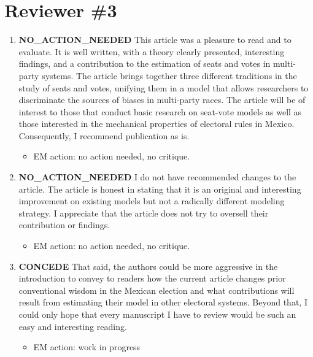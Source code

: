 \documentclass{article}
\begin{document}
\section{Reviewer \#3}
\label{sec:orgheadline20}
\begin{enumerate}
\item {\bfseries\sffamily NO\_ACTION\_NEEDED} This article was a pleasure to read and to evaluate. It is well written, with a theory clearly presented, interesting findings, and a contribution to the estimation of seats and votes in multi-party systems. The article brings together three different traditions in the study of seats and votes, unifying them in a model that allows researchers to discriminate the sources of biases in multi-party races. The article will be of interest to those that conduct basic research on seat-vote models as well as those interested in the mechanical properties of electoral rules in Mexico. Consequently, I recommend publication as is.
\label{sec:orgheadline17}
\begin{itemize}
\item EM action: no action needed, no critique.
\end{itemize}

\item {\bfseries\sffamily NO\_ACTION\_NEEDED} I do not have recommended changes to the article. The article is honest in stating that it is an original and interesting improvement on existing models but not a radically different modeling strategy. I appreciate that the article does not try to oversell their contribution or findings.
\label{sec:orgheadline18}
\begin{itemize}
\item EM action: no action needed, no critique.
\end{itemize}

\item {\bfseries\sffamily CONCEDE} That said, the authors could be more aggressive in the introduction to convey to readers how the current article changes prior conventional wisdom in the Mexican election and what contributions will result from estimating their model in other electoral systems. Beyond that, I could only hope that every manuscript I have to review would be such an easy and interesting reading.
\label{sec:orgheadline19}
\begin{itemize}
\item EM action: work in progress
\end{itemize}
\end{enumerate}
\end{document}
